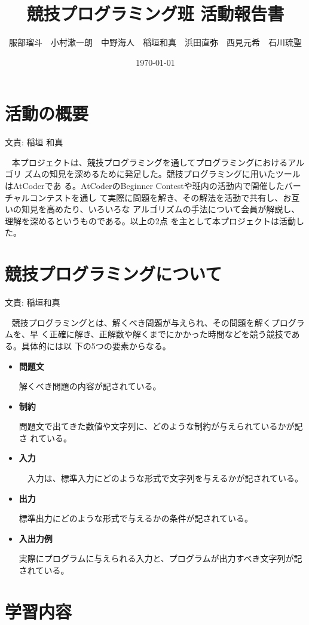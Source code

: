 \documentclass[11pt,a4paper]{jsarticle}
\title{競技プログラミング班 活動報告書}
\author{服部瑠斗　小村漱一朗　中野海人　稲垣和真　浜田直弥　西見元希　石川琉聖}
\date{\today}
\newcommand{\writtenBy}[1]{\begin{flushright}文責: #1\end{flushright}~}
\begin{document}
\maketitle
%
%
\section{活動の概要}
\writtenBy{稲垣 和真}
本プロジェクトは、競技プログラミングを通してプログラミングにおけるアルゴリ
ズムの知見を深めるために発足した。競技プログラミングに用いたツールはAtCoderであ
る。AtCoderのBeginner Contestや班内の活動内で開催したバーチャルコンテストを通し
て実際に問題を解き、その解法を活動で共有し、お互いの知見を高めたり、いろいろな
アルゴリズムの手法について会員が解説し、理解を深めるというものである。以上の2点
を主として本プロジェクトは活動した。

\section{競技プログラミングについて}
\writtenBy{稲垣和真}
競技プログラミングとは、解くべき問題が与えられ、その問題を解くプログラムを、早
く正確に解き、正解数や解くまでにかかった時間などを競う競技である。具体的には以
下の5つの要素からなる。
\begin{itemize}
    \item {\bf 問題文}
        \par
        解くべき問題の内容が記されている。
        \par
    \item {\bf 制約}
        \par
        問題文で出てきた数値や文字列に、どのような制約が与えられているかが記さ
        れている。
    \par
    \item {\bf 入力}
        \par
        　入力は、標準入力にどのような形式で文字列を与えるかが記されている。
    \par
    \item {\bf 出力}
        \par
        標準出力にどのような形式で与えるかの条件が記されている。
    \par
    \item {\bf 入出力例}
        \par
        実際にプログラムに与えられる入力と、プログラムが出力すべき文字列が記されている。
\end{itemize}
\section{学習内容}
\end{document}
